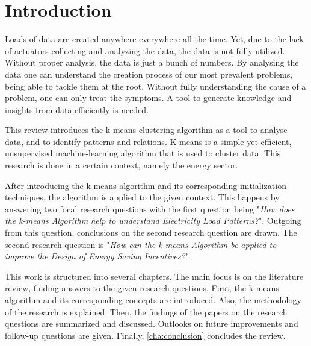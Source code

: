 \chapter{Introduction}
\label{cha:introduction}


Loads of data are created anywhere everywhere all the time.
Yet, due to the lack of actuators collecting and analyzing the data, the data is not fully utilized.
Without proper analysis, the data is just a bunch of numbers.
By analysing the data one can understand the creation process of our most prevalent problems, being able to tackle them at the root.
Without fully understanding the cause of a problem, one can only treat the symptoms.
A tool to generate knowledge and insights from data efficiently is needed.

This review introduces the k-means clustering algorithm as a tool to analyse data, and to identify patterns and relations.
K-means is a simple yet efficient, unsupervised machine-learning algorithm that is used to cluster data.
This research is done in a certain context, namely the energy sector.

After introducing the k-means algorithm and its corresponding initialization techniques, the algorithm is applied to the given context.
This happens by answering two focal research questions with the first question being "\textit{How does the k-means Algorithm help to understand Electricity Load Patterns?}".
Outgoing from this question, conclusions on the second research question are drawn.
The second research question is "\textit{How can the k-means Algorithm be applied to improve the Design of Energy Saving Incentives?}".

This work is structured into several chapters.
The main focus is on the literature review, finding answers to the given research questions.
First, the k-means algorithm and its corresponding concepts are introduced.
Also, the methodology of the research is explained.
Then, the findings of the papers on the research questions are summarized and discussed.
Outlooks on future improvements and follow-up questions are given.
Finally, \autoref{cha:conclusion} concludes the review.